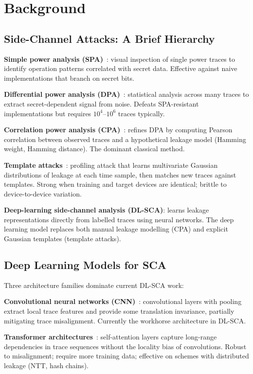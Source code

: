 \documentclass[sigconf,nonacm]{acmart}
\begin{document}
\section{Background}

\subsection{Side-Channel Attacks: A Brief Hierarchy}

\textbf{Simple power analysis (SPA)}~\cite{kocher1996tpa}: visual
inspection of single power traces to identify operation patterns
correlated with secret data. Effective against naive implementations
that branch on secret bits.

\textbf{Differential power analysis (DPA)}~\cite{kocher1999dpa}:
statistical analysis across many traces to extract secret-dependent
signal from noise. Defeats SPA-resistant implementations but requires
$10^4$--$10^6$ traces typically.

\textbf{Correlation power analysis (CPA)}~\cite{brier2004cpa}: refines
DPA by computing Pearson correlation between observed traces and a
hypothetical leakage model (Hamming weight, Hamming distance). The
dominant classical method.

\textbf{Template attacks}~\cite{chari2002template}: profiling
attack that learns multivariate Gaussian distributions of leakage at
each time sample, then matches new traces against templates. Strong
when training and target devices are identical; brittle to
device-to-device variation.

\textbf{Deep-learning side-channel analysis (DL-SCA)}: learns leakage
representations directly from labelled traces using neural networks.
The deep learning model replaces both manual leakage modelling
(CPA) and explicit Gaussian templates (template attacks).

\subsection{Deep Learning Models for SCA}

Three architecture families dominate current DL-SCA work:

\textbf{Convolutional neural networks (CNN)}~\cite{kim2019sca,
zaid2020cnn}: convolutional layers with pooling extract local trace
features and provide some translation invariance, partially mitigating
trace misalignment. Currently the workhorse architecture in
DL-SCA.

\textbf{Transformer architectures}~\cite{lu2024transformersca}: self-attention
layers capture long-range dependencies in trace sequences without the
locality bias of convolutions. Robust to misalignment;
require more training data; effective on schemes with distributed
leakage (NTT, hash chains).
\end{document}
